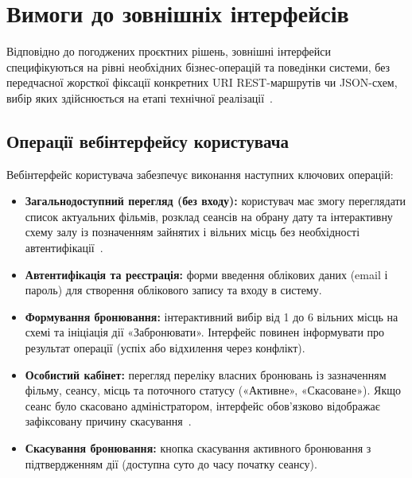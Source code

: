 \section{Вимоги до зовнішніх інтерфейсів}\label{sec:interfeisy}

Відповідно до погоджених проєктних рішень, зовнішні інтерфейси специфікуються на рівні необхідних бізнес-операцій та поведінки системи, без передчасної жорсткої фіксації конкретних URI REST-маршрутів чи JSON-схем, вибір яких здійснюється на етапі технічної реалізації~.

\subsection{Операції вебінтерфейсу користувача}\label{sec:interfeisy-korystuvach}
Вебінтерфейс користувача забезпечує виконання наступних ключових операцій:
\begin{itemize}
    \item \textbf{Загальнодоступний перегляд (без входу):} користувач має змогу переглядати список актуальних фільмів, розклад сеансів на обрану дату та інтерактивну схему залу із позначенням зайнятих і вільних місць без необхідності автентифікації~.
    \item \textbf{Автентифікація та реєстрація:} форми введення облікових даних (email і пароль) для створення облікового запису та входу в систему.
    \item \textbf{Формування бронювання:} інтерактивний вибір від 1 до 6 вільних місць на схемі та ініціація дії «Забронювати». Інтерфейс повинен інформувати про результат операції (успіх або відхилення через конфлікт).
    \item \textbf{Особистий кабінет:} перегляд переліку власних бронювань із зазначенням фільму, сеансу, місць та поточного статусу («Активне», «Скасоване»). Якщо сеанс було скасовано адміністратором, інтерфейс обов'язково відображає зафіксовану причину скасування~.
    \item \textbf{Скасування бронювання:} кнопка скасування активного бронювання з підтвердженням дії (доступна суто до часу початку сеансу).
\end{itemize}

